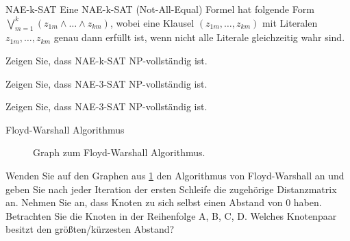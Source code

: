 \documentclass{article}
\begin{document}
\begin{eexercises}{NAE-k-SAT}{
    Eine NAE-k-SAT (Not-All-Equal) Formel hat folgende Form $\bigvee_{m=1}^k (z_{1m} \land \ldots \land z_{km})$, wobei eine Klausel $(z_{1m}, \ldots, z_{km})$ mit Literalen $z_{1m}, \ldots, z_{km}$ genau dann erfüllt ist, wenn nicht alle Literale gleichzeitig wahr sind.
  }
  \item Zeigen Sie, dass NAE-k-SAT NP-vollständig ist.
  \item Zeigen Sie, dass NAE-3-SAT NP-vollständig ist.
  \item Zeigen Sie, dass NAE-3-SAT NP-vollständig ist.
\end{eexercises}

\begin{exercise}{Floyd-Warshall Algorithmus}
  \begin{figure}[ht]
    \centering

    \caption{Graph zum Floyd-Warshall Algorithmus.}\label{fig:floydwarshall}
  \end{figure}
  Wenden Sie auf den Graphen aus \ref{fig:floydwarshall} den Algorithmus von Floyd-Warshall an und geben Sie nach jeder Iteration der ersten Schleife die zugehörige Distanzmatrix an. Nehmen Sie an, dass Knoten zu sich selbst einen Abstand von 0 haben. Betrachten Sie die Knoten in der Reihenfolge A, B, C, D. Welches Knotenpaar besitzt den größten/kürzesten Abstand?
\end{exercise}
\end{document}
